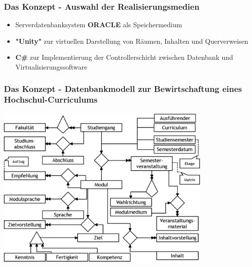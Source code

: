 \documentclass{beamer}
\begin{document}

\begin{frame}
\frametitle{Das Konzept - Auswahl der Realisierungsmedien}
\begin{itemize}
\item Serverdatenbanksystem \textbf{ORACLE} als Speichermedium
\item \textbf{"Unity"} zur virtuellen Darstellung von Räumen, Inhalten und Querverweisen 
\item \textbf{C\#} zur Implementierung der Controllerschicht zwischen Datenbank und Virtualisierungssoftware
\end{itemize}
\end{frame}



\begin{frame}
\frametitle{Das Konzept - Datenbankmodell zur Bewirtschaftung eines Hochschul-Curriculums}
\begin{center}
\includegraphics[width=0.8\textwidth]{pictures/Datenmodell_Viculum.png}
\end{center}
\end{frame}


\end{document}
